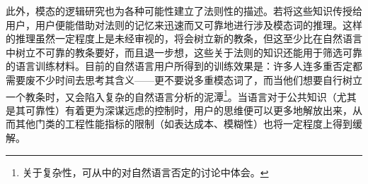 \documentclass[fontset=ubuntu]{ctexart}
\begin{document}
			此外，模态的逻辑研究也为各种可能性建立了法则性的描述。若将这些知识传授给用户，用户便能借助对法则的记忆来迅速而又可靠地进行涉及模态词的推理。这样的推理虽然一定程度上是未经审视的，将会树立新的教条，但这至少比在自然语言中树立不可靠的教条要好，而且退一步想，这些关于法则的知识还能用于筛选可靠的语言训练材料。目前的自然语言用户所得到的训练效果是：许多人连多重否定都需要废不少时间去思考其含义——更不要说多重模态词了，而当他们想要自行树立一个教条时，又会陷入复杂的自然语言分析的泥潭\footnote{关于复杂性，可从\citet{sep-negation}中的对自然语言否定的讨论中体会。}。当语言对于公共知识（尤其是其可靠性）有着更为深谋远虑的控制时，用户的思维便可以更多地解放出来，从而其他门类的工程性能指标的限制（如表达成本、模糊性）也将一定程度上得到缓解。
			
	\nocite{*}
	
\end{document}
